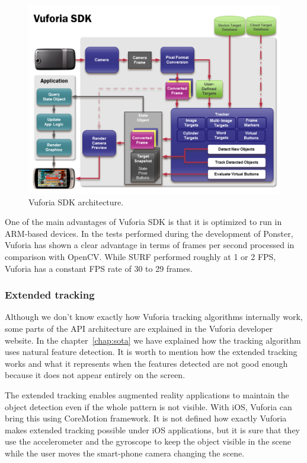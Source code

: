 \begin{figure}
\centering
\includegraphics[scale=0.45]{img/vuforiasdk.png}
\caption{\label{fig:vuforiasdk}Vuforia SDK architecture.}
\end{figure} 

One of the main advantages of Vuforia SDK is that it is optimized to run in
ARM-based devices. In the tests performed during the development of Ponster, Vuforia
has shown a clear advantage in terms of frames per second processed in comparison
with OpenCV. While SURF performed roughly at 1 or 2 FPS, Vuforia has a constant FPS
rate of 30 to 29 frames.

\subsubsection{Extended tracking}
Although we don't know exactly how Vuforia tracking algorithms internally work, some
parts of the API architecture are explained in the Vuforia developer website. In the
chapter~\ref{chap:sota} we have explained how the tracking algorithm uses natural
feature detection. It is worth to mention how the extended tracking works and what
it represents when the features detected are not good enough because it does not
appear entirely on the screen.

The extended tracking enables augmented reality applications to maintain the object
detection even if the whole pattern is not visible. With iOS, Vuforia can bring this
using CoreMotion framework. It is not defined how exactly Vuforia makes extended
tracking possible under iOS applications, but it is sure that they use the
accelerometer and the gyroscope to keep the object visible in the scene while the
user moves the smart-phone camera changing the scene.

